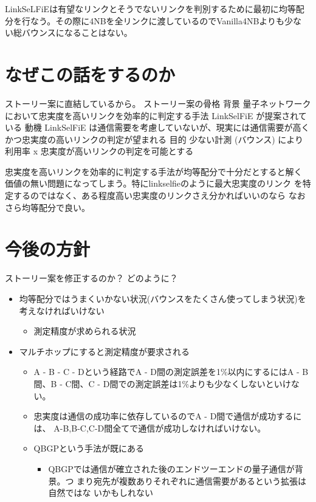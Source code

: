 \documentclass[conference]{IEEEtran}
\begin{document}
LinkSeLFiEは有望なリンクとそうでないリンクを判別するために最初に均等配
分を行なう。その際に4NBを全リンクに渡しているのでVanilla4NBよりも少な
い総バウンスになることはない。

\section{なぜこの話をするのか}
\label{sec:org95b3760}
ストーリー案に直結しているから。
ストーリー案の骨格
背景 量子ネットワークにおいて忠実度を高いリンクを効率的に判定する手法 LinkSelFiE が提案されている
動機 LinkSelFiE は通信需要を考慮していないが、現実には通信需要が高くかつ忠実度の高いリンクの判定が望まれる
目的 少ない計測 (バウンス) により利用率 x 忠実度が高いリンクの判定を可能とする

忠実度を高いリンクを効率的に判定する手法が均等配分で十分だとすると解く
価値の無い問題になってしまう。特にlinkselfieのように最大忠実度のリンク
を特定するのではなく、ある程度高い忠実度のリンクさえ分かればいいのなら
なおさら均等配分で良い。


\section{今後の方針}
\label{sec:org5bad211}
ストーリー案を修正するのか？
どのように？
\begin{itemize}
\item 均等配分ではうまくいかない状況(バウンスをたくさん使ってしまう状況)を考えなければいけない
\begin{itemize}
\item 測定精度が求められる状況
\end{itemize}
\item マルチホップにすると測定精度が要求される
\begin{itemize}
\item A - B - C - Dという経路でA - D間の測定誤差を1\%以内にするにはA - B
間、B - C間、C - D間での測定誤差は1\%よりも少なくしないといけない。
\item 忠実度は通信の成功率に依存しているのでA - D間で通信が成功するには、
A-B,B-C,C-D間全てで通信が成功しなければいけない。
\item QBGPという手法が既にある
\begin{itemize}
\item QBGPでは通信が確立された後のエンドツーエンドの量子通信が背景。つ
まり宛先が複数ありそれぞれに通信需要があるという拡張は自然ではな
いかもしれない
\end{itemize}
\end{itemize}
\end{itemize}
\end{document}
